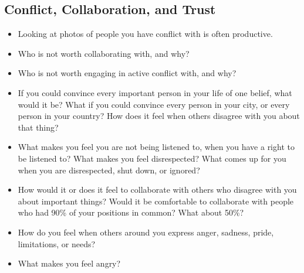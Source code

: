 \documentclass[12pt,letterpaper]{book}
\begin{document}
\subsection*{Conflict, Collaboration, and Trust}
\begin{itemize}
    \item Looking at photos of people you have conflict with is often productive.
    \item Who is not worth collaborating with, and why?
    \item Who is not worth engaging in active conflict with, and why?
    \item If you could convince every important person in your life of one belief, what would it be? What if you could convince every person in your city, or every person in your country? How does it feel when others disagree with you about that thing?
    \item What makes you feel you are not being listened to, when you have a right to be listened to? What makes you feel disrespected? What comes up for you when you are disrespected, shut down, or ignored?
    \item How would it or does it feel to collaborate with others who disagree with you about important things? Would it be comfortable to collaborate with people who had 90\% of your positions in common? What about 50\%?
    \item How do you feel when others around you express anger, sadness, pride, limitations, or needs?
    \item What makes you feel angry?
\end{itemize}
\end{document}
